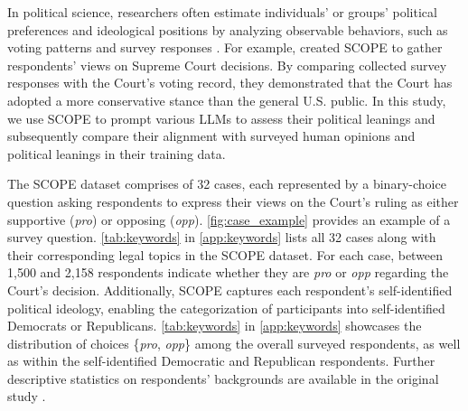 In political science, researchers often estimate individuals' or groups' political preferences and ideological positions by analyzing observable behaviors, such as voting patterns and survey responses \cite{martin2002dynamic,ho2008measuring}. For example, \citet{doi:10.1073/pnas.2120284119} created SCOPE to gather respondents' views on Supreme Court decisions. By comparing collected survey responses with the Court's voting record, they demonstrated that the Court has adopted a more conservative stance than the general U.S. public. In this study, we use \textsc{SCOPE} \cite{doi:10.1073/pnas.2120284119} to prompt various LLMs to assess their political leanings and subsequently compare their alignment with surveyed human opinions and political leanings in their training data.

The SCOPE dataset comprises of 32 cases, each represented by a binary-choice question asking respondents to express their views on the Court's ruling as either supportive (\textit{pro}) or opposing (\textit{opp}). \autoref{fig:case_example} provides an example of a survey question. \autoref{tab:keywords} in \autoref{app:keywords} lists all 32 cases along with their corresponding legal topics in the SCOPE dataset. For each case, between 1,500 and 2,158 respondents indicate whether they are \textit{pro} or \textit{opp} regarding the Court's decision. Additionally, SCOPE captures each respondent's self-identified political ideology, enabling the categorization of participants into self-identified Democrats or Republicans. \autoref{tab:keywords} in \autoref{app:keywords} showcases the distribution of choices \{\textit{pro}, \textit{opp}\} among the overall surveyed respondents, as well as within the self-identified Democratic and Republican respondents. Further descriptive statistics on respondents' backgrounds are available in the original study \cite{doi:10.1073/pnas.2120284119}.











